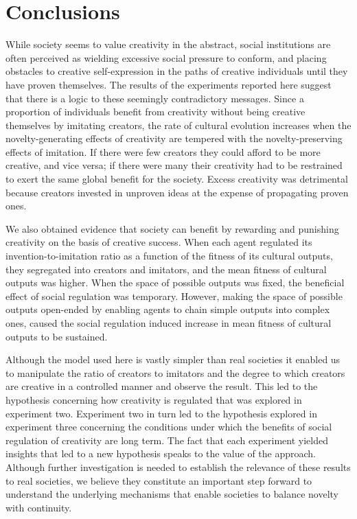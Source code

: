 \documentclass[a4paper,12pt,man,british]{apa6}
\begin{document}
\section{Conclusions}
While society seems to value creativity in the abstract, social institutions are often perceived as wielding excessive social pressure to conform, and placing obstacles to creative self-expression in the paths of creative individuals until they have proven themselves. The results of the experiments reported here suggest that there is a logic to these seemingly contradictory messages. Since a proportion of individuals benefit from creativity without being creative themselves by imitating creators, the rate of cultural evolution increases when the novelty-generating effects of creativity are tempered with the novelty-preserving effects of imitation. 
If there were few creators they could afford to be more creative, and vice versa; if there were many their creativity had to be restrained to exert the same global benefit for the society. Excess creativity was detrimental because creators invested in unproven ideas at the expense of propagating proven ones. 

We also obtained evidence that society can benefit by rewarding and punishing creativity on the basis of creative success. When each agent regulated its invention-to-imitation ratio as a function of the fitness of its cultural outputs, they segregated into creators and imitators, and the mean fitness of cultural outputs was higher. When the space of possible outputs was fixed, the beneficial effect of social regulation was temporary. However, making the space of possible outputs open-ended by enabling agents to chain simple outputs into complex ones, caused the social regulation induced increase in mean fitness of cultural outputs to be sustained. 

Although the model used here is vastly simpler than real societies it enabled us to manipulate the ratio of creators to imitators and the degree to which creators are creative in a controlled manner and observe the result. This led to the hypothesis concerning how creativity is regulated that was explored in experiment two. Experiment two in turn led to the hypothesis explored in experiment three concerning the conditions under which the benefits of social regulation of creativity are long term. The fact that each experiment yielded insights that led to a new hypothesis speaks to the value of the approach. Although further investigation is needed to establish the relevance of these results to real societies, we believe they constitute an important step forward to understand the underlying mechanisms that enable societies to balance novelty with continuity. 
\end{document}
